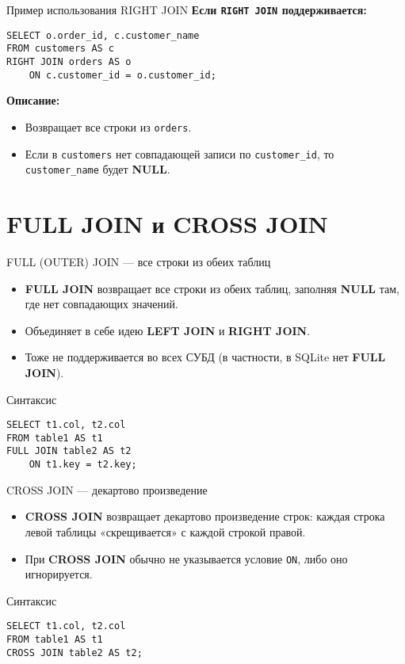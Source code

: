 \documentclass{beamer}
\begin{document}
\begin{frame}[fragile]{Пример использования RIGHT JOIN}
	\textbf{Если \texttt{RIGHT JOIN} поддерживается:}
	\begin{verbatim}
SELECT o.order_id, c.customer_name
FROM customers AS c
RIGHT JOIN orders AS o
    ON c.customer_id = o.customer_id;
\end{verbatim}

	\textbf{Описание:}
	\begin{itemize}
		\item Возвращает все строки из \texttt{orders}.
		\item Если в \texttt{customers} нет совпадающей записи по \texttt{customer\_id},
		      то \texttt{customer\_name} будет \textbf{NULL}.
	\end{itemize}
\end{frame}

\section{FULL JOIN и CROSS JOIN}
\begin{frame}[fragile]{FULL (OUTER) JOIN — все строки из обеих таблиц}
	\begin{itemize}
		\item \textbf{FULL JOIN} возвращает все строки из обеих таблиц,
		      заполняя \textbf{NULL} там, где нет совпадающих значений.
		\item Объединяет в себе идею \textbf{LEFT JOIN} и \textbf{RIGHT JOIN}.
		\item Тоже не поддерживается во всех СУБД (в частности, в SQLite нет \textbf{FULL JOIN}).
	\end{itemize}
	\begin{block}{Синтаксис}
		\begin{verbatim}
SELECT t1.col, t2.col
FROM table1 AS t1
FULL JOIN table2 AS t2
    ON t1.key = t2.key;
\end{verbatim}
	\end{block}
\end{frame}

\begin{frame}[fragile]{CROSS JOIN — декартово произведение}
	\begin{itemize}
		\item \textbf{CROSS JOIN} возвращает декартово произведение строк:
		      каждая строка левой таблицы «скрещивается» с каждой строкой правой.
		\item При \textbf{CROSS JOIN} обычно не указывается условие \texttt{ON}, либо оно игнорируется.
	\end{itemize}
	\begin{block}{Синтаксис}
		\begin{verbatim}
SELECT t1.col, t2.col
FROM table1 AS t1
CROSS JOIN table2 AS t2;
\end{verbatim}
	\end{block}
\end{frame}
\end{document}
